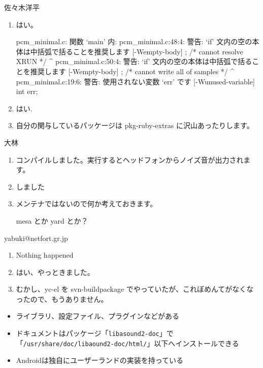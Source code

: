 \documentclass[mingoth,a4paper]{jsarticle}
\begin{document}
\begin{prework}{ 佐々木洋平 }
  \begin{enumerate}
  \item はい。

    \begin{commandline}
pcm_minimal.c: 関数 ‘main’ 内:
pcm_minimal.c:48:4: 警告: ‘if’ 文内の空の本体は中括弧で括ることを推奨します [-Wempty-body]
    ; /* cannot resolve XRUN */
    ^
pcm_minimal.c:50:4: 警告: ‘if’ 文内の空の本体は中括弧で括ることを推奨します [-Wempty-body]
    ; /* cannot write all of samples */
    ^
pcm_minimal.c:19:6: 警告: 使用されない変数 ‘err’ です [-Wunused-variable]
  int err;
    \end{commandline}
  \item はい. 
  \item 自分の関与しているパッケージは pkg-ruby-extras に沢山あったりします。
  \end{enumerate}
\end{prework}

\begin{prework}{ 大林 }
  \begin{enumerate}
  \item コンパイルしました。実行するとヘッドフォンからノイズ音が出力されます。
  \item しました
  \item メンテナではないので何か考えておきます。

    mesa とか yard とか？
  \end{enumerate}
\end{prework}

\begin{prework}{ yabuki@netfort.gr.jp }
  \begin{enumerate}
  \item Nothing happened
  \item はい、やっときました。
  \item むかし、yc-el を svn-buildpackage でやっていたが、これぼめんてがなくなったので、もうありません。
  \end{enumerate}
\end{prework}


\begin{itemize}
\item ライブラリ、設定ファイル、プラグインなどがある
\item ドキュメントはパッケージ「{\tt libasound2-doc}」で「{\tt /usr/share/doc/libaound2-doc/html/}」以下へインストールできる
\item Androidは独自にユーザーランドの実装を持っている
\end{itemize}
\end{document}
